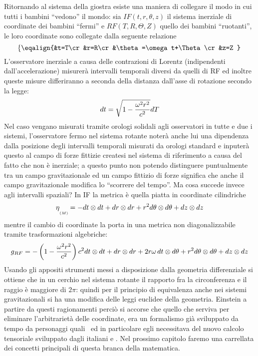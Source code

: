 Ritornando al sistema della giostra esiste una maniera di collegare il modo in cui tutti i bambini ``vedono'' il mondo: sia $IF(t,r,\theta,z)$ il sistema inerziale di coordinate dei bambini ``fermi'' e  $RF(T,R,\Theta,Z)$ quello dei bambini ``ruotanti'', le loro coordinate sono collegate dalla seguente relazione
$$
\left\{\eqalign{%
&t=T\cr
&r=R\cr
&\theta=\omega t+\Theta\cr
&z=Z
}\right.
$$
L'osservatore inerziale a causa delle contrazioni di Lorentz (indipendenti dall'ac\-ce\-le\-ra\-zio\-ne) misurer\`a intervalli temporali diversi da quelli di RF ed inoltre queste misure differiranno a seconda della distanza dall'asse di rotazione secondo la legge:
$$
dt=\sqrt{1-{\omega^2 r^2\over c^2}}dT
$$
Nel caso vengano  misurati tramite orologi solidali agli osservatori in tutte e due i sistemi,  l'osservatore fermo nel sistema rotante noter\`a anche lui una dipendenza dalla posizione degli intervalli temporali misurati da orologi standard e inputer\`a questo al campo di forze fittizie createsi nel sistema di riferimento a causa del fatto che non \`e inerziale; a questo punto non potendo distinguere puntualmente tra un campo gravitazionale ed un campo fittizio di forze significa che anche il campo gravitazionale modifica lo ``scorrere del tempo''. Ma cosa succede invece agli intervalli spaziali? In IF la metrica \`e quella piatta in coordinate cilindriche
$$
\etaM=-\Tensor{dt}+\Tensor{dr}+r^2\Tensor{d\theta}+\Tensor{dz}
$$
 mentre il cambio di coordinate la porta in una metrica non diagonalizzabile tramite trasformazioni algebriche:
$$
g_{RF}=-\left(1-{\omega^2r^2\over c^2}\right)c^2dt\otimes dt+dr\otimes dr+2r\omega\, dt\otimes d\theta+r^2d\theta\otimes d\theta+dz\otimes dz
$$
Usando gli appositi strumenti messi a disposizione dalla geometria differenziale si ottiene che in un cerchio nel sistema rotante il rapporto fra la circonferenza e il raggio \`e maggiore di $2\pi$: quindi per il principio di equivalenza anche nei sistemi gravitazionali si ha una modifica delle leggi euclidee della geometria. Einstein a partire da questi ragionamenti  perci\`o si accorse che quello che serviva per eliminare l'arbitrariet\`a delle coordinate, era un formalismo gi\`a sviluppato da tempo da personaggi quali \break {}\ ed in particolare egli necessitava del nuovo calcolo tensoriale sviluppato dagli italiani  e . Nel prossimo capitolo faremo una car\-rel\-la\-ta dei concetti principali di questa branca della matematica.
